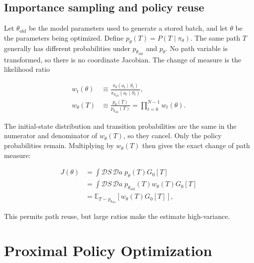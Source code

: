 \documentclass[11pt]{article}
\newcommand{\E}{\mathbb{E}}
\begin{document}
\subsection{Importance sampling and policy reuse}

Let \(\theta_{\mathrm{old}}\) be the model parameters used to generate a
stored batch, and let \(\theta\) be the parameters being optimized.  Define
\(p_\theta(T)=P(T\mid\pi_\theta)\).  The same path \(T\) generally has
different probabilities under \(p_{\theta_{\mathrm{old}}}\) and
\(p_\theta\).  No path variable is transformed, so there is no coordinate
Jacobian.  The change of measure is the likelihood ratio

\begin{equation}
    \begin{split}
    w_t(\theta)
      &\equiv\frac{\pi_\theta(a_t\mid S_t)}
                     {\pi_{\theta_{\mathrm{old}}}(a_t\mid S_t)},\\
    w_\theta(T)
      &\equiv\frac{p_\theta(T)}{p_{\theta_{\mathrm{old}}}(T)}
       =\prod_{t=0}^{N-1}w_t(\theta).
    \end{split}
    \label{eq:path-importance-ratio}
\end{equation}

The initial-state distribution and transition probabilities are the same in
the numerator and denominator of \(w_\theta(T)\), so they cancel.  Only the
policy probabilities remain.  Multiplying by \(w_\theta(T)\) then gives the
exact change of path measure:

\begin{equation}
    \begin{split}
    J(\theta)
      &=\int\mathcal D S\,\mathcal D a\;p_\theta(T)G_0[T]\\
      &=\int\mathcal D S\,\mathcal D a\;p_{\theta_{\mathrm{old}}}(T)
        w_\theta(T)G_0[T]\\
      &=\E_{T\sim p_{\theta_{\mathrm{old}}}}
       \left[
       w_\theta(T)G_0[T]
       \right],
    \end{split}
    \label{eq:importance-objective}
\end{equation}

This permits path reuse, but large ratios make the estimate high-variance.

\newpage
\section{Proximal Policy Optimization}
\end{document}
